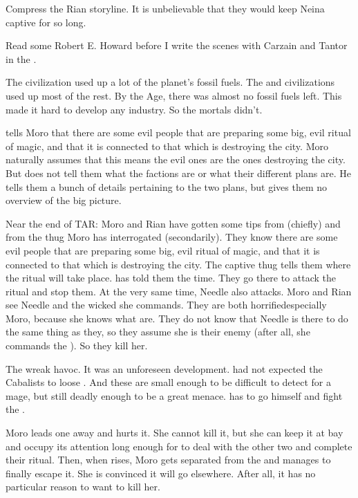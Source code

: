 Compress the Rian storyline. 
It is unbelievable that they would keep Neina captive for so long. 


Read some Robert E. Howard before I write the scenes with Carzain and Tantor in the \wylde. 


The \ophidian civilization used up a lot of the planet's fossil fuels. 
The \quiljaaran and \aryoth civilizations used up most of the rest.
By the \Human Age, there was almost no fossil fuels left.
This made it hard to develop any industry. 
So the mortals didn't. 

\Nasshikerr tells Moro that there are some evil people that are preparing some big, evil ritual of magic, and that it is connected to that which is destroying the city.
Moro naturally assumes that this means the evil ones are the ones destroying the city.
But \Nasshikerr does not tell them what the factions are or what their different plans are.
He tells them a bunch of details pertaining to the two plans, but gives them no overview of the big picture. 

Near the end of TAR:
  Moro and Rian have gotten some tips from \Nasshikerr (chiefly) and from the thug Moro has interrogated (secondarily).
  They know there are some evil people that are preparing some big, evil ritual of magic, and that it is connected to that which is destroying the city.
  The captive thug tells them where the ritual will take place. 
  \Nasshikerr has told them the time. 
  They go there to attack the ritual and stop them.
  At the very same time, Needle also attacks.
  Moro and Rian see Needle and the wicked \banes she commands. 
  They are both horrified\dash{}especially Moro, because she knows what \banes are. 
  They do not know that Needle is there to do the same thing as they, so they assume she is their enemy (after all, she commands the \banes).
  So they kill her. 
  
  The \banes wreak havoc. 
  It was an unforeseen development.
  \Psyrex had not expected the Cabalists to loose \banes. 
  And these \lesser\banes are small enough to be difficult to detect for a mage, but still deadly enough to be a great menace. 
  \Psyrex has to go himself and fight the \banes. 
  
  Moro leads one \bane away and hurts it.
  She cannot kill it, but she can keep it at bay and occupy its attention long enough for \Psyrex to deal with the other two \banes and complete their ritual. 
  Then, when \Nithdornazsh rises, Moro gets separated from the \bane and manages to finally escape it.
  She is convinced it will go elsewhere.
  After all, it has no particular reason to want to kill her. 
  

